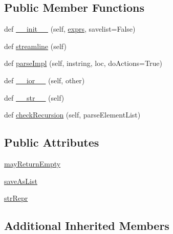 \subsection*{Public Member Functions}
\begin{DoxyCompactItemize}
\item 
def \hyperlink{classpip_1_1__vendor_1_1pyparsing_1_1MatchFirst_ac46ce5147cd67dce3ee086bab65aaad8}{\+\_\+\+\_\+init\+\_\+\+\_\+} (self, \hyperlink{classpip_1_1__vendor_1_1pyparsing_1_1ParseExpression_a55b67003a1a014d5897ce2478411e75a}{exprs}, savelist=False)
\item 
def \hyperlink{classpip_1_1__vendor_1_1pyparsing_1_1MatchFirst_adacb8bdc39a85e156e6af2da27ce79ce}{streamline} (self)
\item 
def \hyperlink{classpip_1_1__vendor_1_1pyparsing_1_1MatchFirst_acef50c3c159a0a67fa3fd7daf5ed7b1a}{parse\+Impl} (self, instring, loc, do\+Actions=True)
\item 
def \hyperlink{classpip_1_1__vendor_1_1pyparsing_1_1MatchFirst_a6b9546fc831474039b8074a14c6d9ec2}{\+\_\+\+\_\+ior\+\_\+\+\_\+} (self, other)
\item 
def \hyperlink{classpip_1_1__vendor_1_1pyparsing_1_1MatchFirst_a833b59f2c4d0dcc8c293546cee8be77b}{\+\_\+\+\_\+str\+\_\+\+\_\+} (self)
\item 
def \hyperlink{classpip_1_1__vendor_1_1pyparsing_1_1MatchFirst_acff2e632bdbd495e6145a55896b41f0a}{check\+Recursion} (self, parse\+Element\+List)
\end{DoxyCompactItemize}
\subsection*{Public Attributes}
\begin{DoxyCompactItemize}
\item 
\hyperlink{classpip_1_1__vendor_1_1pyparsing_1_1MatchFirst_aa9aa0672021a026ac5a87a9f931af665}{may\+Return\+Empty}
\item 
\hyperlink{classpip_1_1__vendor_1_1pyparsing_1_1MatchFirst_ac245d4f92a08831ae7e3c53a315d8819}{save\+As\+List}
\item 
\hyperlink{classpip_1_1__vendor_1_1pyparsing_1_1MatchFirst_acabc8f3aee8a851bb956d8e02a5b32ef}{str\+Repr}
\end{DoxyCompactItemize}
\subsection*{Additional Inherited Members}


